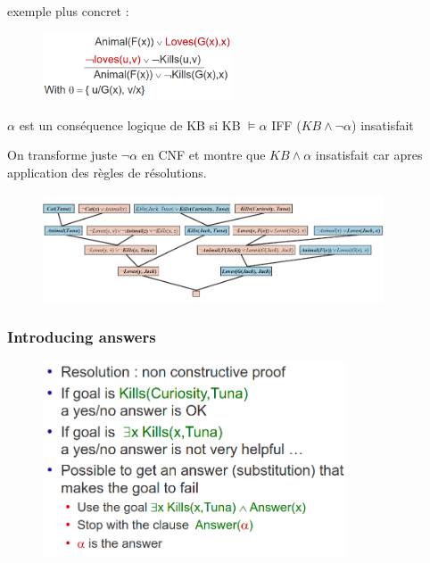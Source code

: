 			exemple plus concret :
			
			\begin{figure}[htp]	
				\centering
				\includegraphics[width=0.5\textwidth]{img/RIR.png}
			\end{figure}	
			
			$\alpha$ est un conséquence logique de KB si KB $\models \alpha$ IFF ($KB \land \neg \alpha$) insatisfait
			
			On transforme juste $\neg \alpha$ en CNF et montre que $KB \land \alpha$ insatisfait car apres application des règles de résolutions.
			
			\begin{figure}[htp]	
				\centering
				\includegraphics[width=0.9\textwidth]{img/RIR1.png}
			\end{figure}
			
		\subsubsection{Introducing answers}
		
			\begin{figure}[htp]	
				\centering
				\includegraphics[width=0.8\textwidth]{img/RIR2.png}
			\end{figure}